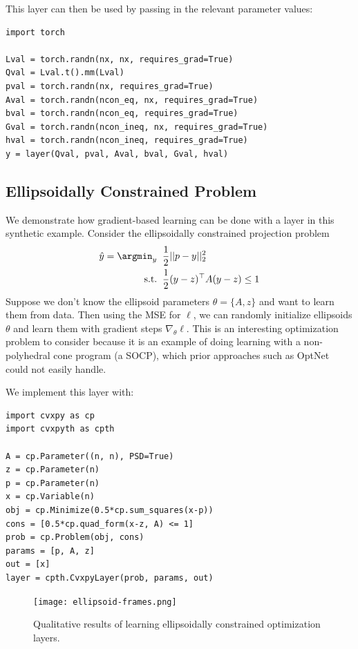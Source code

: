 This layer can then be used by passing in the
relevant parameter values:
\begin{lstlisting}
import torch

Lval = torch.randn(nx, nx, requires_grad=True)
Qval = Lval.t().mm(Lval)
pval = torch.randn(nx, requires_grad=True)
Aval = torch.randn(ncon_eq, nx, requires_grad=True)
bval = torch.randn(ncon_eq, requires_grad=True)
Gval = torch.randn(ncon_ineq, nx, requires_grad=True)
hval = torch.randn(ncon_ineq, requires_grad=True)
y = layer(Qval, pval, Aval, bval, Gval, hval)
\end{lstlisting}

\subsection{Ellipsoidally Constrained Problem}
We demonstrate how gradient-based learning can be done with
a \cvxpy layer in this synthetic example.
Consider the ellipsoidally constrained
projection problem
\begin{align*}
\hat y = \argmin_y\;\; &\frac{1}{2}||p-y||_2^2  \\
 {\rm s.t.}\;\; & \frac{1}{2}(y-z)^\top A(y-z) \leq 1
\end{align*}
Suppose we don't know the ellipsoid parameters $\theta=\{A,z\}$
and want to learn them from data.
Then using the MSE for $\ell$, we can randomly initialize
ellipsoids $\theta$ and learn them with gradient steps $\nabla_\theta \ell$.
This is an interesting optimization problem to consider because
it is an example of doing learning with a non-polyhedral cone
program (a SOCP), which prior approaches such as OptNet
could not easily handle.

We implement this layer with:
\begin{lstlisting}
import cvxpy as cp
import cvxpyth as cpth

A = cp.Parameter((n, n), PSD=True)
z = cp.Parameter(n)
p = cp.Parameter(n)
x = cp.Variable(n)
obj = cp.Minimize(0.5*cp.sum_squares(x-p))
cons = [0.5*cp.quad_form(x-z, A) <= 1]
prob = cp.Problem(obj, cons)
params = [p, A, z]
out = [x]
layer = cpth.CvxpyLayer(prob, params, out)
\end{lstlisting}

\begin{figure}[t]
  \centering
  \texttt{[image: ellipsoid-frames.png]}
  \caption{
    Qualitative results of learning ellipsoidally constrained
    optimization layers.
  }
  \label{fig:ellipsoid-results}
\end{figure}

